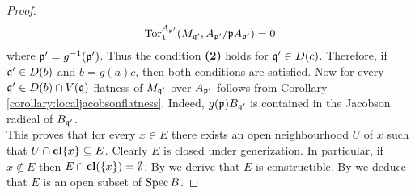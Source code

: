 \begin{proof}
$$\mathrm{Tor}_1^{A_{\mathfrak{p}'}}(M_{\mathfrak{q}'},A_{\mathfrak{p}'}/\mathfrak{p}A_{\mathfrak{p}'})=0$$
where $\mathfrak{p}'=g^{-1}(\mathfrak{p}')$. Thus the condition \textbf{(2)} holds for $\mathfrak{q}'\in D(c)$. Therefore, if $\mathfrak{q}'\in D(b)$ and $b=g(a)c$, then both conditions are satisfied. Now for every $\mathfrak{q}'\in D(b)\cap V(\mathfrak{q})$ flatness of $M_{\mathfrak{q}'}$ over $A_{\mathfrak{p}'}$ follows from Corollary \ref{corollary:localjacobsonflatness}. Indeed, $g(\mathfrak{p})B_{\mathfrak{q}'}$ is contained in the Jacobson radical of $B_{\mathfrak{q}'}$.\\
This proves that for every $x\in E$ there exists an open neighbourhood $U$ of $x$ such that $U\cap \mathbf{cl}\{x\}\subseteq E$. Clearly $E$ is closed under generization. In particular, if $x\not \in E$ then $E\cap \mathbf{cl}(\{x\}) = \emptyset$. By {\cite[Proposition 1.7]{Constructibleandlocallyconstructiblesets}} we derive that $E$ is constructible. By {\cite[Corollary 4.6]{Proconstructiblesets}} we deduce that $E$ is an open subset of $\mathrm{Spec}\, B$.
\end{proof}

